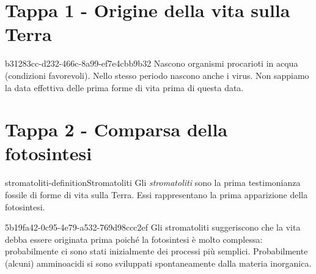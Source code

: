 \documentclass[preview]{standalone}
\begin{document}
\section{Tappa 1 - Origine della vita sulla Terra}

\begin{snippet}{b31283cc-d232-466c-8a99-ef7e4cbb9b32}
    Nascono organismi procarioti in acqua (condizioni favorevoli).
    Nello stesso periodo nascono anche i virus.
    Non sappiamo la data effettiva delle prima forme di vita prima di questa data.
\end{snippet}

\section{Tappa 2 - Comparsa della fotosintesi}

\begin{snippetdefinition}{stromatoliti-definition}{Stromatoliti}
    Gli \textit{stromatoliti} sono la prima testimonianza fossile di forme di vita sulla Terra.
    Essi rappresentano la prima apparizione della fotosintesi.
\end{snippetdefinition}

\begin{snippet}{5b19fa42-0c95-4e79-a532-769d98ccc2ef}
    Gli stromatoliti suggeriscono che la vita debba essere originata prima
    poiché la fotosintesi è molto complessa: probabilmente ci sono stati inizialmente
    dei processi più semplici.
    Probabilmente (alcuni) amminoacidi si sono sviluppati spontaneamente dalla materia
    inorganica.
\end{snippet}
\end{document}
